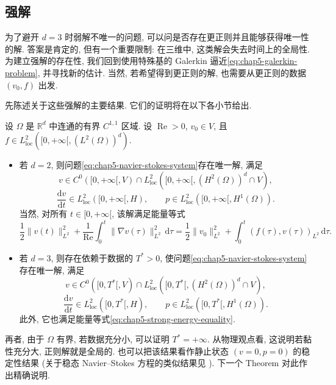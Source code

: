 \clearpage
\subsection{强解}
\label{sec:chap5-strong-solutions}
\renewcommand{\thestatement}{2.\arabic{statement}}
\setcounter{statement}{0}
\renewcommand{\thechapterfivesectiontworemark}{2.\arabic{chapterfivesectiontworemark}}

为了避开 $d=3$ 时弱解不唯一的问题, 可以问是否存在更正则并且能够获得唯一性的解. 答案是肯定的, 但有一个重要限制: 在三维中, 这类解会失去时间上的全局性. 为建立强解的存在性, 我们回到使用特殊基的 Galerkin 逼近\eqref{eq:chap5-galerkin-problem}, 并寻找新的估计. 当然, 若希望得到更正则的解, 也需要从更正则的数据 $(v_0,f)$ 出发.

先陈述关于这些强解的主要结果. 它们的证明将在以下各小节给出.

\begin{Theorem}
\label{thm:chap5-strong-solutions}
设 $\Omega$ 是 $\mathbb R^d$ 中连通的有界 $C^{1,1}$ 区域. 设 $\operatorname{Re}>0$, $v_0\in V$, 且 $f\in L_{\mathrm{loc}}^2([0,+\infty[,(L^2(\Omega))^d)$.
\begin{itemize}
 \item 若 $d=2$, 则问题\eqref{eq:chap5-navier-stokes-system}存在唯一解, 满足
 \[
 v\in C^0([0,+\infty[,V)\cap L_{\mathrm{loc}}^2([0,+\infty[,(H^2(\Omega))^d\cap V),
 \]
 \[
 \frac{\mathrm dv}{\mathrm dt}\in L_{\mathrm{loc}}^2([0,+\infty[,H),
 \qquad
 p\in L_{\mathrm{loc}}^2([0,+\infty[,H^1(\Omega)).
 \]
 当然, 对所有 $t\in[0,+\infty[$, 该解满足能量等式
 \begin{equation}
 \frac12\|v(t)\|_{L^2}^2
 +\frac1{\operatorname{Re}}\int_0^t\|\nabla v(\tau)\|_{L^2}^2\,\mathrm d\tau
 =\frac12\|v_0\|_{L^2}^2+\int_0^t(f(\tau),v(\tau))_{L^2}\,\mathrm d\tau.
 \label{eq:chap5-strong-energy-equality}
 \end{equation}
 \item 若 $d=3$, 则存在依赖于数据的 $T^*>0$, 使问题\eqref{eq:chap5-navier-stokes-system}存在唯一解, 满足
 \[
 v\in C^0([0,T^*[,V)\cap L_{\mathrm{loc}}^2([0,T^*[,(H^2(\Omega))^d\cap V),
 \]
 \[
 \frac{\mathrm dv}{\mathrm dt}\in L_{\mathrm{loc}}^2([0,T^*[,H),
 \qquad
 p\in L_{\mathrm{loc}}^2([0,T^*[,H^1(\Omega)).
 \]
 此外, 它也满足能量等式\eqref{eq:chap5-strong-energy-equality}.
\end{itemize}
\end{Theorem}

再者, 由于 $\Omega$ 有界, 若数据充分小, 可以证明 $T^*=+\infty$. 从物理观点看, 这说明若黏性充分大, 正则解就是全局的. 也可以把该结果看作静止状态 $(v=0,p=0)$ 的稳定性结果 (关于稳态 Navier--Stokes 方程的类似结果见 ). 下一个 Theorem 对此作出精确说明.

